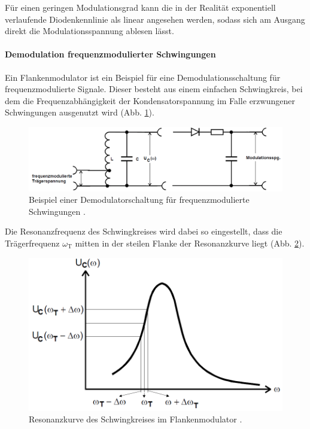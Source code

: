 Für einen geringen Modulationsgrad kann die in der Realität exponentiell verlaufende Diodenkennlinie als linear angesehen werden, sodass sich am Ausgang direkt die Modulationsspannung ablesen lässt.

\paragraph{Demodulation frequenzmodulierter Schwingungen}
Ein Flankenmodulator ist ein Beispiel für eine Demodulationsschaltung für frequenzmodulierte Signale.
Dieser besteht aus einem einfachen Schwingkreis, bei dem die Frequenzabhängigkeit der Kondensatorspannung im Falle erzwungener Schwingungen ausgenutzt wird (Abb. \ref{fdm:schaltung}).

\begin{figure}[!h]
    \centering
    \includegraphics[width = 14cm]{images/fdm_schaltung.png}
    \caption{Beispiel einer Demodulatorschaltung für frequenzmodulierte Schwingungen \cite{V59}.}
    \label{fdm:schaltung}
\end{figure}

Die Resonanzfrequenz des Schwingkreises wird dabei so eingestellt, dass die Trägerfrequenz $\omega_\text{T}$ mitten in der steilen Flanke der Resonanzkurve liegt (Abb. \ref{fdm:resonanz}).

\begin{figure}[!h]
    \centering
    \includegraphics[width = 14cm]{images/fdm_resonanz.png}
    \caption{Resonanzkurve des Schwingkreises im Flankenmodulator \cite{V59}.}
    \label{fdm:resonanz}
\end{figure}

